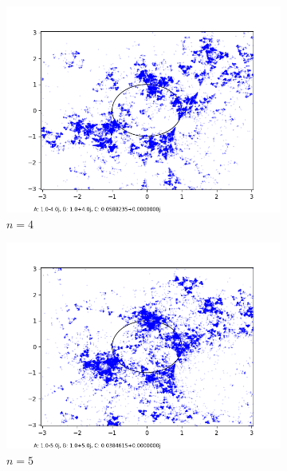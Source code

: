 \documentclass[12pt,a4paper,reqno,parskip=full]{amsart}
\numberwithin{equation}{section}
\theoremstyle{plain}
\theoremstyle{definition}
\begin{document}
\begin{figure}[H]
\begin{subfigure}[b]{0.3\textwidth}
         \includegraphics[width=\textwidth]{images/nn/a-4 b4 h30 d0.01.png}
         \caption{$n=4$}
         \label{fig:n4}
     \end{subfigure}
     \hfill
     \begin{subfigure}[b]{0.3\textwidth}
         \centering
         \includegraphics[width=\textwidth]{images/nn/a-5 b5 h30 d0.01.png}
         \caption{$n=5$}
         \label{fig:n5}
     \end{subfigure}
     \hfill 
     \begin{subfigure}[b]{0.3\textwidth}
         \centering

\end{subfigure}
\end{figure}
\end{document}

